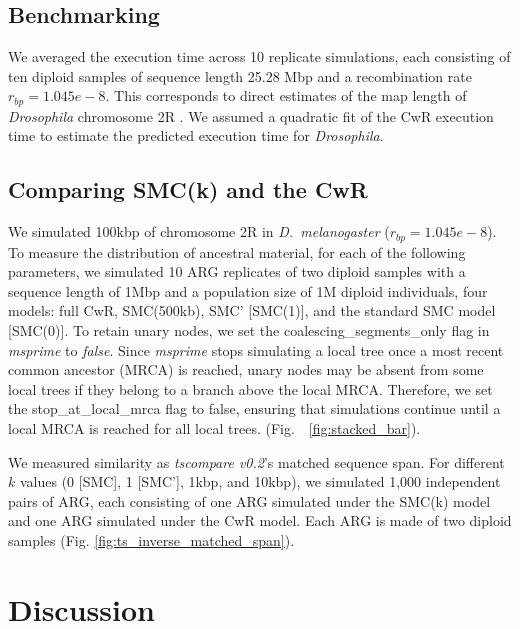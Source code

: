 \documentclass[9pt,twocolumn,twoside,lineno]{gsajnl}
\begin{document}
\subsection{Benchmarking} We averaged the execution time across 10 replicate
simulations, each consisting of ten diploid samples of sequence length 25.28
Mbp and a recombination rate $r_{bp}= 1.045e-8$. This corresponds to direct
estimates of the map length of \textit{Drosophila} chromosome 2R \citep[][Table
2]{comeron2012}. We assumed a quadratic fit of the CwR execution time to
estimate the predicted execution time for \textit{Drosophila}.

\subsection{Comparing SMC(k) and the CwR} We simulated 100kbp of chromosome 2R
in \textit{D.\ melanogaster} ($r_{bp}=1.045e-8$). To measure the distribution
of ancestral material, for each of the following parameters, we simulated 10
ARG replicates of two diploid samples with a sequence length of 1Mbp and a
population size of 1M  diploid individuals, four models: full CwR, SMC(500kb),
SMC' [SMC(1)], and the standard SMC model [SMC(0)]. To retain unary nodes, we
set the coalescing\_segments\_only flag in \textit{msprime} to \textit{false}.
Since \textit{msprime} stops simulating a local tree once a most recent common
ancestor (MRCA) is reached, unary nodes may be absent from some local trees if
they belong to a branch above the local MRCA. Therefore, we set the
stop\_at\_local\_mrca flag to false, ensuring that simulations continue until a local MRCA is reached for all local trees. (Fig.\ ~\ref{fig:stacked_bar}).

We measured similarity as \textit{tscompare v0.2}'s matched sequence span. For different $k$ values (0 [SMC], 1 [SMC'], 1kbp, and 10kbp), we simulated 1,000 independent pairs of ARG, each consisting of one ARG simulated under the SMC(k) model and one ARG simulated under the CwR model. Each ARG is made of two diploid samples (Fig. \ref{fig:ts_inverse_matched_span}).

\section{Discussion}
\end{document}
